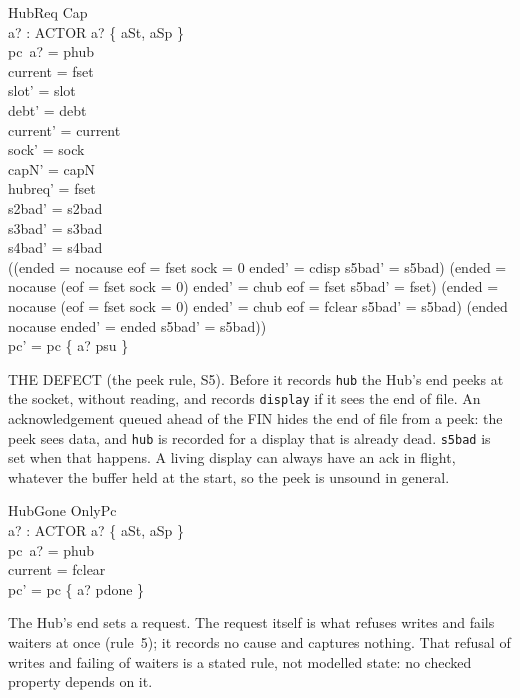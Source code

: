 \documentclass[a4paper,10pt,fleqn]{article}
\begin{document}
\begin{schema}{HubReq}
  Cap \\
  a? : ACTOR
\where
  a? \in \{ aSt, aSp \} \\
  pc~a? = phub \\
  current = fset \\
  slot' = slot \\
  debt' = debt \\
  current' = current \\
  sock' = sock \\
  capN' = capN \\
  hubreq' = fset \\
  s2bad' = s2bad \\
  s3bad' = s3bad \\
  s4bad' = s4bad \\
  ((ended = nocause \land eof = fset \land sock = 0 \land ended' = cdisp \land
      s5bad' = s5bad) \lor
    (ended = nocause \land \lnot (eof = fset \land sock = 0) \land ended' = chub \land
      eof = fset \land s5bad' = fset) \lor
    (ended = nocause \land \lnot (eof = fset \land sock = 0) \land ended' = chub \land
      eof = fclear \land s5bad' = s5bad) \lor
    (ended \neq nocause \land ended' = ended \land s5bad' = s5bad)) \\
  pc' = pc \oplus \{ a? \mapsto psu \}
\end{schema}

THE DEFECT (the peek rule, S5).  Before it records \texttt{hub} the Hub's end
peeks at the socket, without reading, and records \texttt{display} if it sees the
end of file.  An acknowledgement queued ahead of the FIN hides the end of file
from a peek: the peek sees data, and \texttt{hub} is recorded for a display that
is already dead.  \texttt{s5bad} is set when that happens.  A living display can
always have an ack in flight, whatever the buffer held at the start, so the peek
is unsound in general.

\begin{schema}{HubGone}
  OnlyPc \\
  a? : ACTOR
\where
  a? \in \{ aSt, aSp \} \\
  pc~a? = phub \\
  current = fclear \\
  pc' = pc \oplus \{ a? \mapsto pdone \}
\end{schema}

The Hub's end sets a request.  The request itself is what refuses writes and
fails waiters at once (rule~5); it records no cause and captures nothing.  That
refusal of writes and failing of waiters is a stated rule, not modelled state:
no checked property depends on it.
\end{document}
